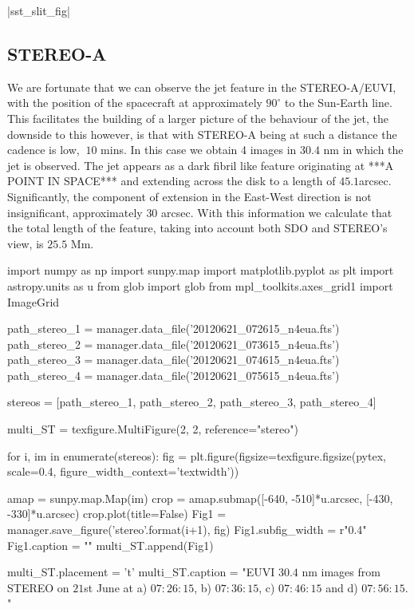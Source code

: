 \documentclass{emulateapj}
\begin{document}
|sst_slit_fig|



\subsection{STEREO-A}
We are fortunate that we can observe the jet feature in the STEREO-A/EUVI, with the position of the spacecraft at approximately $90^\circ$ to the Sun-Earth line.
This facilitates the building of a larger picture of the behaviour of the jet, the downside to this however, is that with STEREO-A being at such a distance the cadence is low, $~10$ mins.
In this case we obtain 4 images in $30.4$ nm in which the jet is observed.
The jet appears as a dark fibril like feature originating at ***A POINT IN SPACE*** and extending across the disk to a length of $45.1$arcsec.
Significantly, the component of extension in the East-West direction is not insignificant, approximately $30$ arcsec.
With this information we calculate that the total length of the feature, taking into account both SDO and STEREO's view, is $25.5$ Mm.



\begin{pycode}[STEREO]
import numpy as np
import sunpy.map
import matplotlib.pyplot as plt
import astropy.units as u
from glob import glob
from mpl_toolkits.axes_grid1 import ImageGrid

path_stereo_1 = manager.data_file('20120621_072615_n4eua.fts')
path_stereo_2 = manager.data_file('20120621_073615_n4eua.fts')
path_stereo_3 = manager.data_file('20120621_074615_n4eua.fts')
path_stereo_4 = manager.data_file('20120621_075615_n4eua.fts')

stereos = [path_stereo_1, path_stereo_2, path_stereo_3, path_stereo_4]


multi_ST = texfigure.MultiFigure(2, 2, reference="stereo")


for i, im in enumerate(stereos):
	fig = plt.figure(figsize=texfigure.figsize(pytex, scale=0.4, figure_width_context='textwidth'))
	
	amap = sunpy.map.Map(im)
	crop = amap.submap([-640, -510]*u.arcsec, [-430, -330]*u.arcsec)
	crop.plot(title=False)
	Fig1 = manager.save_figure('stereo{}'.format(i+1), fig)
	Fig1.subfig_width = r"0.4\textwidth"
	Fig1.caption = ""
	multi_ST.append(Fig1)

multi_ST.placement = 't'
multi_ST.caption = "EUVI $30.4$ nm images from STEREO on $21$st June at a) $07:26:15$, b) $07:36:15$, c) $07:46:15$ and d) $07:56:15$. "
\end{pycode}
\end{document}
